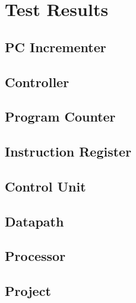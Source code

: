 \section{Test Results} %
\label{sec:test_results}

\subsection{PC Incrementer} %
\label{ssub:pc_incrementer}


\subsection{Controller} %
\label{ssub:controller}


\subsection{Program Counter} %
\label{ssub:program_counter}


\subsection{Instruction Register} %
\label{ssub:instruction_register}


\subsection{Control Unit} %
\label{ssub:control_unit}


\subsection{Datapath} %
\label{ssub:datapath}


\subsection{Processor} %
\label{ssub:processor}


\subsection{Project} %
\label{ssub:projects}


